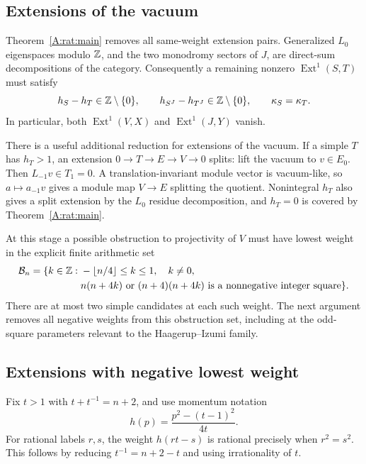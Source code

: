 \documentclass[11pt]{article}
\newcommand{\Ext}{\operatorname{Ext}}\newcommand{\wt}{\operatorname{wt}}
\numberwithin{equation}{section}
\begin{document}
\subsection{Extensions of the vacuum}
Theorem~\ref{A:rat:main} removes all same-weight extension pairs. Generalized $L_0$ eigenspaces modulo $\mathbb Z$, and the two monodromy sectors of $J$, are direct-sum decompositions of the category. Consequently a remaining nonzero $\Ext^1(S,T)$ must satisfy
\[
 h_S-h_T\in\mathbb Z\setminus\{0\},\qquad
 h_{S^J}-h_{T^J}\in\mathbb Z\setminus\{0\},
 \qquad \kappa_S=\kappa_T.
\]
In particular, both $\Ext^1(V,X)$ and $\Ext^1(J,Y)$ vanish.

There is a useful additional reduction for extensions of the vacuum. If a simple $T$ has $h_T>1$, an extension $0\to T\to E\to V\to0$ splits: lift the vacuum to $v\in E_0$. Then $L_{-1}v\in T_1=0$. A translation-invariant module vector is vacuum-like, so $a\mapsto a_{-1}v$ gives a module map $V\to E$ splitting the quotient. Nonintegral $h_T$ also gives a split extension by the $L_0$ residue decomposition, and $h_T=0$ is covered by Theorem~\ref{A:rat:main}.

At this stage a possible obstruction to projectivity of $V$ must have lowest weight in the explicit finite arithmetic set
\begin{equation}\label{A:rat:badset}
 \begin{split}
 \mathcal B_n=\{k\in\mathbb Z:\;&-\lfloor n/4\rfloor\leq k\leq1,\quad k\ne0,\\
 &n(n+4k)\text{ or }(n+4)(n+4k)\text{ is a nonnegative integer square}\}.
 \end{split}
\end{equation}
There are at most two simple candidates at each such weight. The next argument removes all negative weights from this obstruction set, including at the odd-square parameters relevant to the Haagerup--Izumi family.

\subsection{Extensions with negative lowest weight}
Fix $t>1$ with $t+t^{-1}=n+2$, and use momentum notation
\[
 h(p)=\frac{p^2-(t-1)^2}{4t}.
\]
For rational labels $r,s$, the weight $h(rt-s)$ is rational precisely when $r^2=s^2$. This follows by reducing $t^{-1}=n+2-t$ and using irrationality of $t$.
\end{document}
